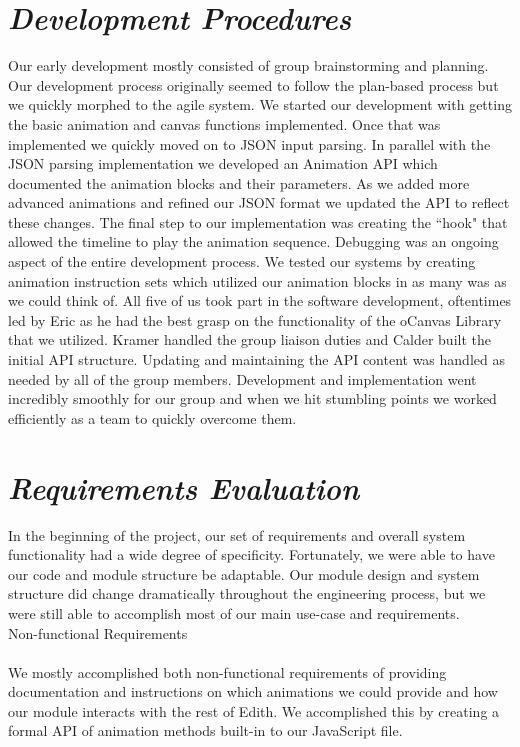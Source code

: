 \documentclass[12pt]{article}
\begin{document}
\section{\emph{\Large Development Procedures}}
Our early development mostly consisted of group brainstorming and planning.  Our development process originally seemed to follow the plan-based process but we quickly morphed to the agile system.
We started our development with getting the basic animation and canvas functions implemented.  Once that was implemented we quickly moved on to JSON input parsing.  In parallel with the JSON parsing implementation we developed an Animation API which documented the animation blocks and their parameters.  As we added more advanced animations and refined our JSON format we updated the API to reflect these changes.  The final step to our implementation was creating the ``hook" that allowed the timeline to play the animation sequence.  Debugging was an ongoing aspect of the entire development process.
We tested our systems by creating animation instruction sets which utilized our animation blocks in as many was as we could think of.  
All five of us took part in the software development, oftentimes led by Eric as he had the best grasp on the functionality of the oCanvas Library that we utilized.  Kramer handled the group liaison duties and Calder built the initial API structure.  Updating and maintaining the API content was handled as needed by all of the group members.
Development and implementation went incredibly smoothly for our group and when we hit stumbling points we worked efficiently as a team to quickly overcome them.


\section{\emph{\Large Requirements Evaluation}}
In the beginning of the project, our set of requirements and overall system functionality had a wide degree of specificity. Fortunately, we were able to have our code and module structure be adaptable. Our module design and system structure did change dramatically throughout the engineering process, but we were still able to accomplish most of our main use-case and requirements.\\

\large Non-functional Requirements\\\\
We mostly accomplished both non-functional requirements of providing documentation and instructions on which animations we could provide and how our module interacts with the rest of Edith. We accomplished this by creating a formal API of animation methods built-in to our JavaScript file.
\end{document}
